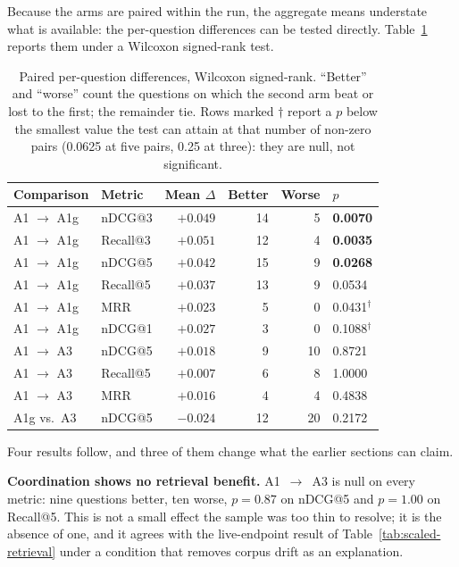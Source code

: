 \documentclass[acmsmall,review,anonymous,screen]{acmart}
\begin{document}
Because the arms are paired within the run, the aggregate means understate what
is available: the per-question differences can be tested directly.
Table~\ref{tab:ladder-paired} reports them under a Wilcoxon signed-rank test.

\begin{table}[t]
\caption{Paired per-question differences, Wilcoxon signed-rank. ``Better'' and
``worse'' count the questions on which the second arm beat or lost to the
first; the remainder tie. Rows marked $\dagger$ report a $p$ below the smallest
value the test can attain at that number of non-zero pairs (0.0625 at five
pairs, 0.25 at three): they are null, not significant.}
\label{tab:ladder-paired}
\begin{tabular}{llrrrl}
\toprule
Comparison & Metric & Mean $\Delta$ & Better & Worse & $p$ \\
\midrule
A1 $\to$ A1g  & nDCG@3   & $+0.049$ & 14 & 5  & \textbf{0.0070} \\
A1 $\to$ A1g  & Recall@3 & $+0.051$ & 12 & 4  & \textbf{0.0035} \\
A1 $\to$ A1g  & nDCG@5   & $+0.042$ & 15 & 9  & \textbf{0.0268} \\
A1 $\to$ A1g  & Recall@5 & $+0.037$ & 13 & 9  & 0.0534 \\
A1 $\to$ A1g  & MRR      & $+0.023$ & 5  & 0  & 0.0431$^\dagger$ \\
A1 $\to$ A1g  & nDCG@1   & $+0.027$ & 3  & 0  & 0.1088$^\dagger$ \\
\midrule
A1 $\to$ A3   & nDCG@5   & $+0.018$ & 9  & 10 & 0.8721 \\
A1 $\to$ A3   & Recall@5 & $+0.007$ & 6  & 8  & 1.0000 \\
A1 $\to$ A3   & MRR      & $+0.016$ & 4  & 4  & 0.4838 \\
\midrule
A1g vs.\ A3   & nDCG@5   & $-0.024$ & 12 & 20 & 0.2172 \\
\bottomrule
\end{tabular}
\end{table}

Four results follow, and three of them change what the earlier sections can
claim.

\textbf{Coordination shows no retrieval benefit.} A1~$\to$~A3 is null on every
metric: nine questions better, ten worse, $p=0.87$ on nDCG@5 and $p=1.00$ on
Recall@5. This is not a small effect the sample was too thin to resolve; it is
the absence of one, and it agrees with the live-endpoint result of
Table~\ref{tab:scaled-retrieval} under a condition that removes corpus drift as
an explanation.
\end{document}
